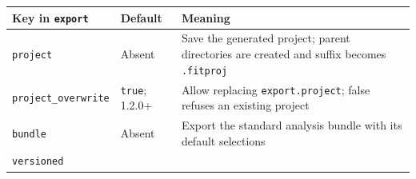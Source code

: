 \documentclass[
  10pt,
  a4paper,
  oneside]{scrreprt}
\begin{document}
\begin{longtable}[]{@{}lll@{}}
\toprule
\begin{minipage}[b]{0.30\columnwidth}\raggedright
Key in \texttt{export}\strut
\end{minipage} & \begin{minipage}[b]{0.30\columnwidth}\raggedright
Default\strut
\end{minipage} & \begin{minipage}[b]{0.30\columnwidth}\raggedright
Meaning\strut
\end{minipage}\tabularnewline
\midrule
\endhead
\begin{minipage}[t]{0.30\columnwidth}\raggedright
\texttt{project}\strut
\end{minipage} & \begin{minipage}[t]{0.30\columnwidth}\raggedright
Absent\strut
\end{minipage} & \begin{minipage}[t]{0.30\columnwidth}\raggedright
Save the generated project; parent directories are created and suffix
becomes \texttt{.fitproj}\strut
\end{minipage}\tabularnewline
\begin{minipage}[t]{0.30\columnwidth}\raggedright
\texttt{project\_overwrite}\strut
\end{minipage} & \begin{minipage}[t]{0.30\columnwidth}\raggedright
\texttt{true}; 1.2.0+\strut
\end{minipage} & \begin{minipage}[t]{0.30\columnwidth}\raggedright
Allow replacing \texttt{export.project}; false refuses an existing
project\strut
\end{minipage}\tabularnewline
\begin{minipage}[t]{0.30\columnwidth}\raggedright
\texttt{bundle}\strut
\end{minipage} & \begin{minipage}[t]{0.30\columnwidth}\raggedright
Absent\strut
\end{minipage} & \begin{minipage}[t]{0.30\columnwidth}\raggedright
Export the standard analysis bundle with its default selections\strut
\end{minipage}\tabularnewline
\begin{minipage}[t]{0.30\columnwidth}\raggedright
\texttt{versioned}\strut
\end{minipage} & \begin{minipage}[t]{0.30\columnwidth}\raggedright

\end{minipage}
\end{longtable}
\end{document}
